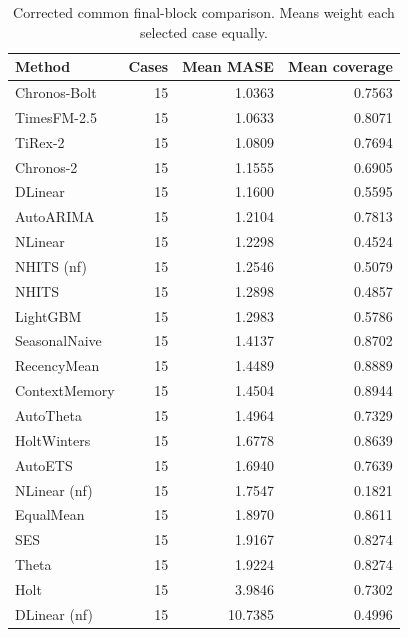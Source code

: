 \begin{longtable}{lrrr}
\caption{Corrected common final-block comparison. Means weight each selected case equally.}\\
\toprule Method & Cases & Mean MASE & Mean coverage\\\midrule\endhead
Chronos-Bolt & 15 & 1.0363 & 0.7563 \\
TimesFM-2.5 & 15 & 1.0633 & 0.8071 \\
TiRex-2 & 15 & 1.0809 & 0.7694 \\
Chronos-2 & 15 & 1.1555 & 0.6905 \\
DLinear & 15 & 1.1600 & 0.5595 \\
AutoARIMA & 15 & 1.2104 & 0.7813 \\
NLinear & 15 & 1.2298 & 0.4524 \\
NHITS (nf) & 15 & 1.2546 & 0.5079 \\
NHITS & 15 & 1.2898 & 0.4857 \\
LightGBM & 15 & 1.2983 & 0.5786 \\
SeasonalNaive & 15 & 1.4137 & 0.8702 \\
RecencyMean & 15 & 1.4489 & 0.8889 \\
ContextMemory & 15 & 1.4504 & 0.8944 \\
AutoTheta & 15 & 1.4964 & 0.7329 \\
HoltWinters & 15 & 1.6778 & 0.8639 \\
AutoETS & 15 & 1.6940 & 0.7639 \\
NLinear (nf) & 15 & 1.7547 & 0.1821 \\
EqualMean & 15 & 1.8970 & 0.8611 \\
SES & 15 & 1.9167 & 0.8274 \\
Theta & 15 & 1.9224 & 0.8274 \\
Holt & 15 & 3.9846 & 0.7302 \\
DLinear (nf) & 15 & 10.7385 & 0.4996 \\
\bottomrule
\end{longtable}
